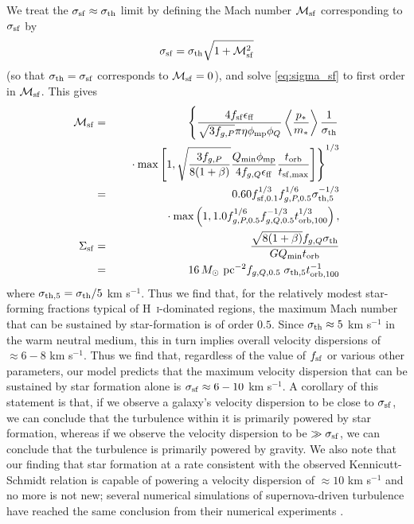 \documentclass[useAMS,usenatbib]{mn2e}
\newcommand{\phimp}{\phi_{\mathrm{mp}}}
\newcommand{\Qmin}{Q_{\rm min}}
\begin{document}
We treat the $\sigma_{\rm sf} \approx \sigma_{\rm th}$ limit by defining the Mach number $\mathcal{M}_{\rm sf}$ corresponding to $\sigma_{\rm sf}$ by
\begin{equation}
\sigma_{\rm sf} = \sigma_{\rm th}\sqrt{1 +\mathcal{M}_{\rm sf}^2}
\end{equation}
(so that $\sigma_{\rm th} = \sigma_{\rm sf}$ corresponds to $\mathcal{M}_{\rm sf} = 0$), and solve \autoref{eq:sigma_sf} to first order in $\mathcal{M}_{\rm sf}$. This gives
\begin{eqnarray}
\mathcal{M}_{\rm sf} & = & \left\{\frac{4f_{\rm sf} \epsilon_{\rm ff}}{\sqrt{3 f_{g,P}} \pi \eta \phimp \phi_Q}
\left\langle\frac{p_*}{m_*}\right\rangle\frac{1}{\sigma_{\rm th}}
\right.
\nonumber \\
& & 
\quad \left.
{} \cdot
\max\left[1,
\sqrt{\frac{3 f_{g,P}}{8(1+\beta)}} \frac{\Qmin \phimp}{4 f_{g,Q} \epsilon_{\rm ff}}\frac{t_{\rm orb}}{t_{\rm sf,max}}\right]\right\}^{1/3} \\
& = & 0.60 f_{\rm sf,0.1}^{1/3} f_{g,P,0.5}^{1/6} \sigma_{\rm th,5}^{-1/3}
\nonumber \\
& &
\quad {} \cdot \max\left(1, 1.0 f_{g,P,0.5}^{1/6} f_{g,Q,0.5}^{-1/3} t_{\rm orb,100}^{1/3}\right),
\label{eq:sigma_sf_num2}
\\
\Sigma_{\rm sf} & = & \frac{\sqrt{8(1+\beta)} f_{g,Q} \sigma_{\rm th}}{G \Qmin t_{\rm orb}} \\
& = & 16\,M_\odot\mbox{ pc}^{-2} f_{g,Q,0.5} \; \sigma_{\rm th,5} t_{\rm orb,100}^{-1}
\end{eqnarray}
where $\sigma_{\rm th,5} = \sigma_{\rm th}/5$ km s$^{-1}$. Thus we find that, for the relatively modest star-forming fractions typical of H~\textsc{i}-dominated regions, the maximum Mach number that can be sustained by star-formation is of order $0.5$. Since $\sigma_{\rm th} \approx 5$ km s$^{-1}$ in the warm neutral medium, this in turn implies overall velocity dispersions of $\approx 6-8$ km s$^{-1}$. Thus we find that, regardless of the value of $f_{\rm sf}$ or various other parameters, our model predicts that the maximum velocity dispersion that can be sustained by star formation alone is $\sigma_{\rm sf} \approx 6-10$ km s$^{-1}$. A corollary of this statement is that, if we observe a galaxy's velocity dispersion to be close to $\sigma_{\rm sf}$, we can conclude that the turbulence within it is primarily powered by star formation, whereas if we observe the velocity dispersion to be $\gg \sigma_{\rm sf}$, we can conclude that the turbulence is primarily powered by gravity. We also note that our finding that star formation at a rate consistent with the observed Kennicutt-Schmidt relation is capable of powering a velocity dispersion of $\approx 10$ km s$^{-1}$ and no more is not new; several numerical simulations of supernova-driven turbulence have reached the same conclusion from their numerical experiments \citep[e.g.,][]{joung09a, kim11a, kim15b}.
\end{document}
